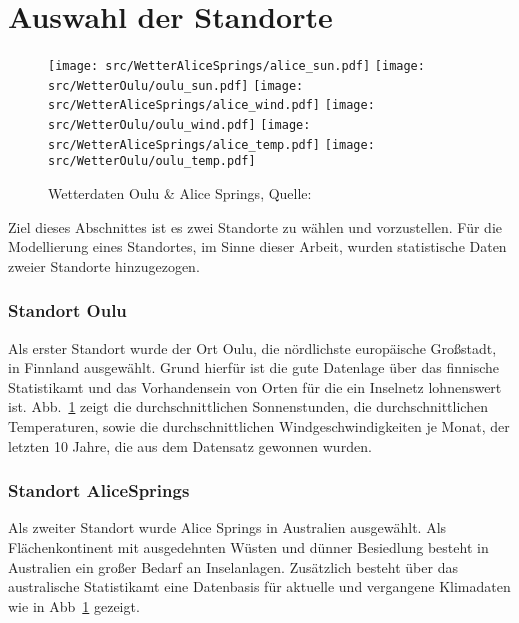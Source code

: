   \section{Auswahl der Standorte}
    \begin{figure}[h]
        \vspace{-10pt}
        \centering 
        \texttt{[image: src/WetterAliceSprings/alice\_sun.pdf]}
        \texttt{[image: src/WetterOulu/oulu\_sun.pdf]}
        \texttt{[image: src/WetterAliceSprings/alice\_wind.pdf]}
        \texttt{[image: src/WetterOulu/oulu\_wind.pdf]}
        \texttt{[image: src/WetterAliceSprings/alice\_temp.pdf]}
        \texttt{[image: src/WetterOulu/oulu\_temp.pdf]}
        \caption[Wetterdaten Oulu \& Alice Springs]{Wetterdaten Oulu \& Alice Springs, Quelle:\cite{Webp:WWOAS}\cite{Webp:WWOFIN}}\label{fig:WTR}
        \vspace{-5pt}
    \end{figure}
      Ziel dieses Abschnittes ist es zwei Standorte zu wählen und vorzustellen.
      Für die Modellierung eines Standortes, im Sinne dieser Arbeit, wurden statistische Daten zweier Standorte hinzugezogen.
      \subsubsection{Standort Oulu}
        Als erster Standort wurde der Ort Oulu, die nördlichste europäische Großstadt, in Finnland ausgewählt.
        Grund hierfür ist die gute Datenlage über das finnische Statistikamt und das Vorhandensein von Orten für die ein Inselnetz lohnenswert ist.
        Abb.~\ref{fig:WTR} zeigt die durchschnittlichen Sonnenstunden, die durchschnittlichen Temperaturen, sowie die durchschnittlichen Windgeschwindigkeiten je Monat, der letzten 10 Jahre, die aus dem Datensatz gewonnen wurden.
        
      \subsubsection{Standort AliceSprings}
        Als zweiter Standort wurde Alice Springs in Australien ausgewählt.
        Als Flächenkontinent mit ausgedehnten Wüsten und dünner Besiedlung besteht in Australien ein großer Bedarf an Inselanlagen.
        Zusätzlich besteht über das australische Statistikamt eine Datenbasis für aktuelle und vergangene Klimadaten wie in Abb~\ref{fig:WTR} gezeigt.
